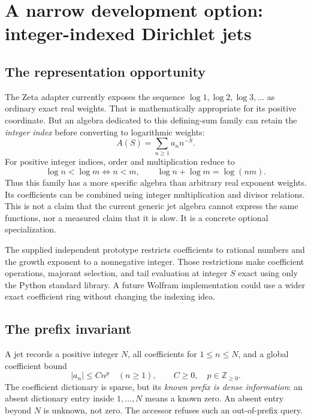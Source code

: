 \documentclass[11pt,letterpaper]{article}
\begin{document}
\section{A narrow development option: integer-indexed Dirichlet jets}
\subsection{The representation opportunity}
The Zeta adapter currently exposes the sequence $\log1,\log2,\log3,\ldots$ as
ordinary exact real weights. That is mathematically appropriate for its
positive coordinate. But an algebra dedicated to this defining-sum family can
retain the \emph{integer index} before converting to logarithmic weights:
\begin{equation}\label{eq:dirichlet}
 A(S)=\sum_{n\geq1}a_n n^{-S}.
\end{equation}
For positive integer indices, order and multiplication reduce to
\begin{equation}
 \log n<\log m\iff n<m,
 \qquad \log n+\log m=\log(nm).
\end{equation}
Thus this family has a more specific algebra than arbitrary real exponent
weights. Its coefficients can be combined using integer multiplication and
divisor relations. This is not a claim that the current generic jet algebra
cannot express the same functions, nor a measured claim that it is slow.
It is a concrete optional specialization.

The supplied independent prototype restricts coefficients to rational numbers
and the growth exponent to a nonnegative integer. Those restrictions make
coefficient operations, majorant selection, and tail evaluation at integer $S$
exact using only the Python standard library. A future Wolfram implementation
could use a wider exact coefficient ring without changing the indexing idea.

\subsection{The prefix invariant}
A jet records a positive integer $N$, all coefficients for $1\leq n\leq N$,
and a global coefficient bound
\begin{equation}\label{eq:growth}
 |a_n|\leq Cn^p\quad(n\geq1),\qquad C\geq0,
 \quad p\in\mathbb Z_{\geq0}.
\end{equation}
The coefficient dictionary is sparse, but its \emph{known prefix is dense
information}: an absent dictionary entry inside $1,\ldots,N$ means a known zero.
An absent entry beyond $N$ is unknown, not zero. The accessor refuses such an
out-of-prefix query.
\end{document}
